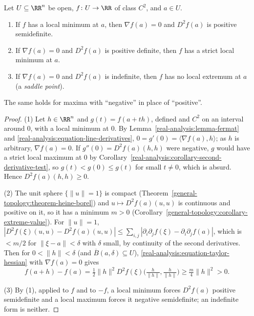 \begin{proposition}\label{real-analysis:proposition-hessian-test}
Let $U \subseteq \RR^n$ be open, $f \colon U \to \RR$ of class $C^2$, and $a \in U$.
\begin{enumerate}
\item If $f$ has a local minimum at $a$, then $\nabla f(a) = 0$ and $D^2f(a)$ is positive semidefinite.
\item If $\nabla f(a) = 0$ and $D^2f(a)$ is positive definite, then $f$ has a strict local minimum at $a$.
\item If $\nabla f(a) = 0$ and $D^2f(a)$ is indefinite, then $f$ has no local extremum at $a$ (a \emph{saddle point}).
\end{enumerate}
The same holds for maxima with ``negative'' in place of ``positive''.
\end{proposition}

\begin{proof}
(1) Let $h \in \RR^n$ and $g(t) = f(a + th)$, defined and $C^2$ on an interval around $0$, with a local minimum at $0$. By Lemma~\ref{real-analysis:lemma-fermat} and
\eqref{real-analysis:equation-line-derivatives}, $0 = g'(0) = \langle\nabla f(a), h\rangle$; as $h$ is arbitrary, $\nabla f(a) = 0$. If $g''(0) = D^2f(a)(h, h)$ were negative, $g$ would have a strict local
maximum at $0$ by Corollary~\ref{real-analysis:corollary-second-derivative-test}, so $g(t) < g(0) \leq g(t)$ for small $t \neq 0$, which is absurd. Hence $D^2f(a)(h, h) \geq 0$.

(2) The unit sphere $\{\|u\| = 1\}$ is compact (Theorem~\ref{general-topology:theorem-heine-borel}) and $u \mapsto D^2f(a)(u, u)$ is continuous and positive on it, so it has a minimum $m > 0$
(Corollary~\ref{general-topology:corollary-extreme-value}). For $\|u\| = 1$,
$|D^2f(\xi)(u, u) - D^2f(a)(u, u)| \leq \sum_{i,j}|\partial_i\partial_jf(\xi) - \partial_i\partial_jf(a)|$, which is $< m/2$ for $\|\xi - a\| < \delta$ with $\delta$ small, by continuity of the second
derivatives. Then for $0 < \|h\| < \delta$ (and $\overline{B}(a, \delta) \subseteq U$), \eqref{real-analysis:equation-taylor-hessian} with $\nabla f(a) = 0$ gives
\[
f(a + h) - f(a) = \tfrac12\|h\|^2D^2f(\xi)\bigl(\tfrac{h}{\|h\|}, \tfrac{h}{\|h\|}\bigr) \geq \tfrac{m}{4}\|h\|^2 > 0.
\]

(3) By (1), applied to $f$ and to $-f$, a local minimum forces $D^2f(a)$ positive semidefinite and a local maximum forces it negative semidefinite; an indefinite form is neither.
\end{proof}

